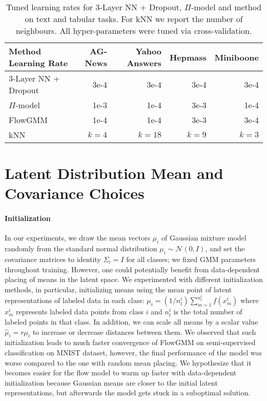 \documentclass{article}
\newcommand{\method}{FlowGMM\xspace}
\newcommand{\mN}{\mathcal{N}}
\begin{document}
\begin{table*}[t]
	\centering
	\caption{
	Tuned learning rates for 3-Layer NN + Dropout, $\Pi$-model and method on text and tabular tasks. 
	For kNN we report the number of neighbours. 
	All hyper-parameters were tuned via cross-validation.
	}
	\label{tab:ssl_learning_rates}
    \centering
    \small
	\begin{tabular}{lrrrr}
		Method Learning Rate      & AG-News  
                                  & Yahoo Answers
                                  & Hepmass 
                                  & Miniboone\\
       \midrule
        3-Layer NN + Dropout & 3e-4 & 3e-4 & 3e-4 & 3e-4 \\
        $\Pi$-model & 1e-3 & 1e-4 & 3e-3 & 1e-4 \\
        \method & 1e-4 & 1e-4 & 3e-3 & 3e-4 \\
        \midrule
        kNN & $k=4$ & $k=18$ & $k=9$ & $k=3$ \\
        
        
	\end{tabular}
\end{table*}


\section{Latent Distribution Mean and Covariance Choices}\label{sec:meanchoice}

\paragraph{Initialization} In our experiments, we draw the mean vectors $\mu_i$ of Gaussian mixture model randomly from the standard normal distribution $\mu_i \sim \mN(0, I)$, and set the covariance matrices to identity $\Sigma_i = I$ for all classes; we fixed GMM parameters throughout training.
However, one could potentially benefit from data-dependent placing of means in the latent space. We experimented with different initialization methods, in particular, initializing means using the mean point of latent representations of labeled data in each class: ${\mu_i = (1 / n_l^i) \sum_{m=1}^{n_l^i} f(x^i_m)}$ where $x^i_m$ represents labeled data points from class $i$ and $n^i_l$ is the total number of labeled points in that class. In addition, we can scale all means by a scalar value $\hat{\mu}_i = r \mu_i$ to increase or decrease distances between them. We observed that such initialization leads to much faster convergence of FlowGMM on semi-supervised classification on MNIST dataset, however, the final performance of the model was worse compared to the one with random mean placing. We hypothesize that it becomes easier for the flow model to warm up faster with data-dependent initialization because Gaussian means are closer to the initial latent representations, but afterwards the model gets stuck in a suboptimal solution. 
\end{document}
